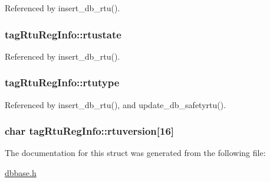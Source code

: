 Referenced by insert\-\_\-db\-\_\-rtu().

\hypertarget{structtagRtuRegInfo_aa8cbcd6d4cc75ae2941924d7192575b8}{
\subsubsection[{rtustate}]{ tag\-Rtu\-Reg\-Info\-::rtustate}}\label{structtagRtuRegInfo_aa8cbcd6d4cc75ae2941924d7192575b8}


Referenced by insert\-\_\-db\-\_\-rtu().

\hypertarget{structtagRtuRegInfo_a2334be9e41158bdab0bda7916cecffbc}{
\subsubsection[{rtutype}]{ tag\-Rtu\-Reg\-Info\-::rtutype}}\label{structtagRtuRegInfo_a2334be9e41158bdab0bda7916cecffbc}


Referenced by insert\-\_\-db\-\_\-rtu(), and update\-\_\-db\-\_\-safetyrtu().

\hypertarget{structtagRtuRegInfo_a7ca4730d5e1c74afc6d0fd939fecf65f}{
\subsubsection[{rtuversion}]{\setlength{\rightskip}{0pt plus 5cm}char tag\-Rtu\-Reg\-Info\-::rtuversion\mbox{[}16\mbox{]}}}\label{structtagRtuRegInfo_a7ca4730d5e1c74afc6d0fd939fecf65f}


The documentation for this struct was generated from the following file\-:\begin{DoxyCompactItemize}
\item 
\hyperlink{dbbase_8h}{dbbase.\-h}\end{DoxyCompactItemize}
